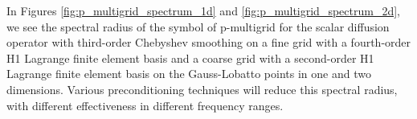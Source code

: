 In Figures \ref{fig:p_multigrid_spectrum_1d} and \ref{fig:p_multigrid_spectrum_2d}, we see the spectral radius of the symbol of p-multigrid for the scalar diffusion operator with third-order Chebyshev smoothing on a fine grid with a fourth-order H1 Lagrange finite element basis and a coarse grid with a second-order H1 Lagrange finite element basis on the Gauss-Lobatto points in one and two dimensions.
Various preconditioning techniques will reduce this spectral radius, with different effectiveness in different frequency ranges.
